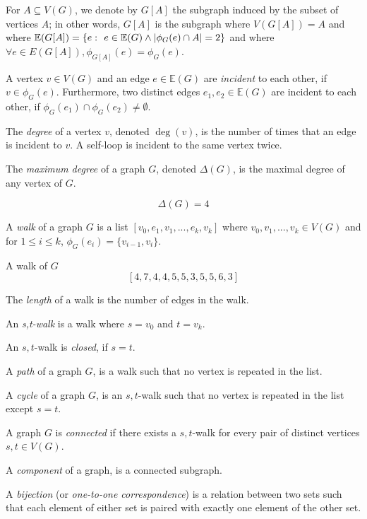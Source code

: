 \documentclass{article}
\begin{document}
	For $A \subseteq V(G)$, we denote by $G[A]$ the subgraph induced by the subset of vertices $A$; in other words, $G[A]$ is the subgraph where $V(G[A]) = A$ and where $\mathbb{E}(G[A]) = \{ e \,\colon\  e \in \mathbb{E}(G) \land |\phi_G(e) \cap A| = 2\}$ and where $\forall e \in E(G[A]), \phi_{G[A]}(e) = \phi_{G}(e)$.

	\begin{center}
		
	\end{center}

	A vertex $v \in V(G)$ and an edge $e \in \mathbb{E}(G)$ are \textit{incident} to each other, if $v \in \phi_G(e)$. Furthermore, two distinct edges $e_1,e_2 \in \mathbb{E}(G)$ are incident to each other, if $\phi_G(e_1) \cap \phi_G(e_2) \neq \emptyset$.

	The \textit{degree} of a vertex $v$, denoted $\deg(v)$, is the number of times that an edge is incident to $v$. A self-loop is incident to the same vertex twice.

	\begin{center}
		
	\end{center}

	The \textit{maximum degree} of a graph $G$, denoted $\Delta(G)$, is the maximal degree of any vertex of $G$.

	$$\Delta(G) = 4$$

	A \textit{walk} of a graph $G$ is a list $[v_0,e_1,v_1,...,e_k,v_k]$ where $v_0,v_1,...,v_k \in V(G)$ and for $1 \leq i \leq k$, $\phi_{G}(e_i) = \{v_{i-1}, v_i\}$.

	A walk of $G$ $$[4,7,4,4,5,5,3,5,5,6,3]$$

	The \textit{length} of a walk is the number of edges in the walk.
	
	An \textit{s,t-walk} is a walk where $s = v_0$ and $t = v_k$.

	An $s,t$-walk is \textit{closed}, if $s = t$.

	A \textit{path} of a graph $G$, is a walk such that no vertex is repeated in the list.

	A \textit{cycle} of a graph $G$, is an $s,t$-walk such that no vertex is repeated in the list except $s=t$.

	A graph $G$ is \textit{connected} if there exists a $s,t$-walk for every pair of distinct vertices $s,t \in V(G)$.

	A \textit{component} of a graph, is a connected subgraph.

	A \textit{bijection} (or \textit{one-to-one correspondence}) is a relation between two sets such that each element of either set is paired with exactly one element of the other set.
\end{document}
